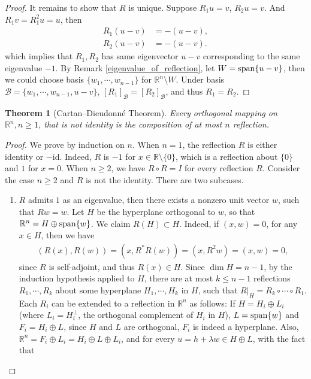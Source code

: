 \documentclass[11pt]{book}
\newtheorem{theorem}{Theorem}[chapter]
\theoremstyle{definition}
\numberwithin{equation}{chapter}
\begin{document}
\begin{subappendices}
\begin{proof}
It remains to show that $R$ is unique. Suppose $R_1 u = v$, $R_2 u = v$. And $R_1 v = R_1^2 u = u$, then 
\begin{align*}
    R_1 (u-v) & = - (u-v), \\
    R_2 (u-v) & = - (u-v).
\end{align*}
which implies that $R_1, R_2$ has same eigenvector $u - v$ corresponding to the same eigenvalue $-1$. By Remark \ref{eigenvalue_of_reflection}, let $W = {\rm span}\{u-v\}$, then we could choose basis $\{w_1, \cdots, w_{n-1}\}$ for $\mathbb{R}^n \setminus W$. Under basis $\mathcal{B} = \{w_1, \cdots, w_{n-1}, u-v\}$, $[R_1]_{\mathcal{B}} = [R_2]_{\mathcal{B}}$, and thus $R_1 = R_2$.
\end{proof}

\medskip

\begin{theorem}[Cartan–Dieudonné Theorem]{\rm \cite{35}} \label{Cartan_Dieudonne}
Every orthogonal mapping on $\mathbb{R}^n, n \geq 1$, that is not identity is the composition of at most $n$ reflection.
\end{theorem}
\begin{proof}
We prove by induction on $n$. When $n = 1$, the reflection $R$ is either identity or $-$id. Indeed, $R$ is $-1$ for $x \in \mathbb{R} \setminus \{0\}$, which is a reflection about $\{0\}$ and $1$ for $x = 0$. When $n \geq 2$, we have $R \circ R = I$ for every reflection $R$. Consider the case $n \geq 2$ and $R$ is not the identity. There are two subcases.
\begin{enumerate}[label=(\alph*)]
    \item $R$ admits $1$ as an eigenvalue, then there exists a nonzero unit vector $w$, such that $Rw = w$. Let $H$ be the hyperplane orthogonal to $w$, so that $\mathbb{R}^n = H \oplus {\rm span}\{w\}$. We claim $R(H) \subset H$. Indeed, if $(x, w) = 0$, for any $x \in H$, then we have 
    \begin{align*}
        (R(x), R(w)) = (x, R^* R(w)) = (x, R^2 w) = (x, w) = 0,
    \end{align*}
    since $R$ is self-adjoint, and thus $R(x) \in H$. Since $\dim H = n - 1$, by the induction hypothesis applied to $H$, there are at most $k \leq n - 1$ reflections $R_1, \cdots, R_k$ about some hyperplane $H_1, \cdots, H_k$ in $H$, such that $R|_H = R_k \circ \cdots \circ R_1$. Each $R_i$ can be extended to a reflection in $\mathbb{R}^n$ as follows: If $H = H_i \oplus L_i$ (where $L_i = H_i^\bot$, the orthogonal complement of $H_i$ in $H$), $L = {\rm span}\{w\}$ and $F_i = H_i \oplus L$, since $H$ and $L$ are orthogonal, $F_i$ is indeed a hyperplane. Also, $\mathbb{R}^n = F_i \oplus L_i = H_i \oplus L \oplus L_i$, and for every $u = h + \lambda w \in H \oplus L$, with the fact that

\end{enumerate}
\end{proof}
\end{subappendices}
\end{document}
